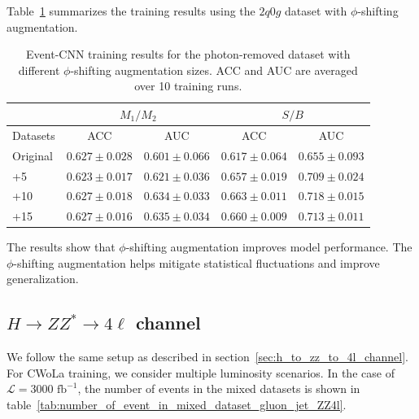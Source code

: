 \documentclass[12pt]{article}
\begin{document}
        Table~\ref{tab:CWoLa_event_CNN_training_results_100_jet_tagging_phi_aug_5_10_15} summarizes the training results using the $2q0g$ dataset with $\phi$-shifting augmentation.
        \begin{table}[htpb]
            \centering
            \caption{Event-CNN training results for the photon-removed dataset with different $\phi$-shifting augmentation sizes. ACC and AUC are averaged over 10 training runs.}
            \label{tab:CWoLa_event_CNN_training_results_100_jet_tagging_phi_aug_5_10_15}
            \begin{tabular}{l|cc|cc}
                         & \multicolumn{2}{c|}{$M_1 / M_2$}      & \multicolumn{2}{c}{$S / B$}           \\ \hline
                Datasets & ACC               & AUC               & ACC               & AUC               \\ \hline
                Original & $0.627 \pm 0.028$ & $0.601 \pm 0.066$ & $0.617 \pm 0.064$ & $0.655 \pm 0.093$ \\
                +5       & $0.623 \pm 0.017$ & $0.621 \pm 0.036$ & $0.657 \pm 0.019$ & $0.709 \pm 0.024$ \\
                +10      & $0.627 \pm 0.018$ & $0.634 \pm 0.033$ & $0.663 \pm 0.011$ & $0.718 \pm 0.015$ \\
                +15      & $0.627 \pm 0.016$ & $0.635 \pm 0.034$ & $0.660 \pm 0.009$ & $0.713 \pm 0.011$
            \end{tabular}
        \end{table}
        The results show that $\phi$-shifting augmentation improves model performance. The $\phi$-shifting augmentation helps mitigate statistical fluctuations and improve generalization.
    \subsection{\texorpdfstring{$H \to ZZ^* \to 4\ell$}{H to ZZ to 4l} channel}%
    \label{sub:h_to_zz_to_4l_channel}
        We follow the same setup as described in section~\ref{sec:h_to_zz_to_4l_channel}. For CWoLa training, we consider multiple luminosity scenarios. In the case of $\mathcal{L} = \text{3000 fb}^{-1}$, the number of events in the mixed datasets is shown in table~\ref{tab:number_of_event_in_mixed_dataset_gluon_jet_ZZ4l}.
        
\end{document}
